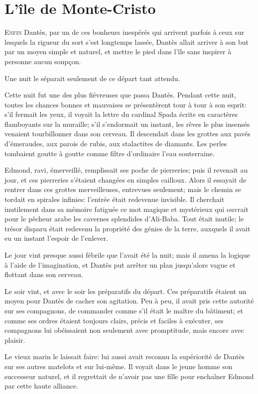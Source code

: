 \chapter{L'île de Monte-Cristo}

\lettrine{E}{nfin} Dantès, par un de ces bonheurs inespérés qui arrivent parfois à ceux sur lesquels la rigueur du sort s'est longtemps lassée, Dantès allait arriver à son but par un moyen simple et naturel, et mettre le pied dans l'île sans inspirer à personne aucun soupçon.

Une nuit le séparait seulement de ce départ tant attendu.

Cette nuit fut une des plus fiévreuses que passa Dantès. Pendant cette nuit, toutes les chances bonnes et mauvaises se présentèrent tour à tour à son esprit: s'il fermait les yeux, il voyait la lettre du cardinal Spada écrite en caractères flamboyants sur la muraille; s'il s'endormait un instant, les rêves le plus insensés venaient tourbillonner dans son cerveau. Il descendait dans les grottes aux pavés d'émeraudes, aux parois de rubis, aux stalactites de diamants. Les perles tombaient goutte à goutte comme filtre d'ordinaire l'eau souterraine.

Edmond, ravi, émerveillé, remplissait ses poche de pierreries; puis il revenait au jour, et ces pierreries s'étaient changées en simples cailloux. Alors il essayait de rentrer dans ces grottes merveilleuses, entrevues seulement; mais le chemin se tordait en spirales infinies: l'entrée était redevenue invisible. Il cherchait inutilement dans sa mémoire fatiguée ce mot magique et mystérieux qui ouvrait pour le pêcheur arabe les cavernes splendides d'Ali-Baba. Tout était inutile; le trésor disparu était redevenu la propriété des génies de la terre, auxquels il avait eu un instant l'espoir de l'enlever.

Le jour vint presque aussi fébrile que l'avait été la nuit; mais il amena la logique à l'aide de l'imagination, et Dantès put arrêter un plan jusqu'alors vague et flottant dans son cerveau.

Le soir vint, et avec le soir les préparatifs du départ. Ces préparatifs étaient un moyen pour Dantès de cacher son agitation. Peu à peu, il avait pris cette autorité sur ses compagnons, de commander comme s'il était le maître du bâtiment; et comme ses ordres étaient toujours clairs, précis et faciles à exécuter, ses compagnons lui obéissaient non seulement avec promptitude, mais encore avec plaisir.

Le vieux marin le laissait faire: lui aussi avait reconnu la supériorité de Dantès sur ses autres matelots et sur lui-même. Il voyait dans le jeune homme son successeur naturel, et il regrettait de n'avoir pas une fille pour enchaîner Edmond par cette haute alliance.

